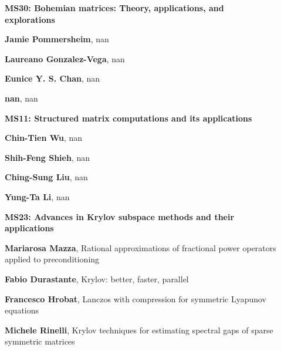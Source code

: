 \documentclass[ILAS2025-program.tex]{subfiles}
\begin{document}
\begin{description}
\begin{description}
        \end{description}
    \begin{description}
    \item[] {\color{mstitle}\textbf{MS30: Bohemian matrices: Theory, applications, and explorations}} 
    \item[] \textbf{Jamie Pommersheim}, nan
        \item[] \textbf{Laureano Gonzalez-Vega}, nan
        \item[] \textbf{Eunice Y. S. Chan}, nan
        \item[] \textbf{nan}, nan
        \end{description}
    \begin{description}
    \item[] {\color{mstitle}\textbf{MS11: Structured matrix computations and its applications}} 
    \item[] \textbf{Chin-Tien Wu}, nan
        \item[] \textbf{Shih-Feng Shieh}, nan
        \item[] \textbf{Ching-Sung Liu}, nan
        \item[] \textbf{Yung-Ta Li}, nan
        \end{description}
    \begin{description}
    \item[] {\color{mstitle}\textbf{MS23: Advances in Krylov subspace methods and their applications}} 
    \item[] \textbf{Mariarosa Mazza}, Rational approximations of fractional power operators applied to preconditioning
        \item[] \textbf{Fabio Durastante}, Krylov: better, faster, parallel
        \item[] \textbf{Francesco Hrobat}, Lanczos with compression for symmetric Lyapunov equations
        \item[] \textbf{Michele Rinelli}, Krylov techniques for estimating spectral gaps of sparse symmetric matrices
        \end{description}
    \end{description}
    \newpage
\end{document}
